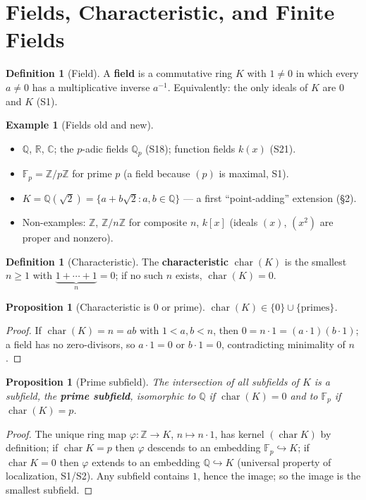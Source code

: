 \documentclass[11pt,a4paper]{article}
\newtheorem{proposition}[theorem]{Proposition}
\theoremstyle{definition}
\newtheorem{definition}[theorem]{Definition}
\newtheorem{example}[theorem]{Example}
\newcommand{\Z}{\mathbb{Z}}
\newcommand{\Q}{\mathbb{Q}}
\newcommand{\R}{\mathbb{R}}
\newcommand{\C}{\mathbb{C}}
\newcommand{\F}{\mathbb{F}}
\newcommand{\ch}{\operatorname{char}}
\begin{document}
\tableofcontents
\newpage

\section{Fields, Characteristic, and Finite Fields}

\begin{definition}[Field]
A \textbf{field} is a commutative ring $K$ with $1\neq0$ in which every $a\neq0$ has a multiplicative
inverse $a^{-1}$. Equivalently: the only ideals of $K$ are $0$ and $K$ (S1).
\end{definition}

\begin{example}[Fields old and new]\label{ex:fields}
\begin{itemize}
  \item $\Q$, $\R$, $\C$; the $p$-adic fields $\Q_p$ (S18); function fields $k(x)$ (S21).
  \item $\F_p=\Z/p\Z$ for prime $p$ (a field because $(p)$ is maximal, S1).
  \item $K=\Q(\sqrt2)=\{a+b\sqrt2:a,b\in\Q\}$ --- a first ``point-adding'' extension (\S2).
  \item Non-examples: $\Z$, $\Z/n\Z$ for composite $n$, $k[x]$ (ideals $(x)$, $(x^2)$ are proper and nonzero).
\end{itemize}
\end{example}

\begin{definition}[Characteristic]
The \textbf{characteristic} $\ch(K)$ is the smallest $n\ge1$ with $\underbrace{1+\cdots+1}_{n}=0$;
if no such $n$ exists, $\ch(K)=0$.
\end{definition}

\begin{proposition}[Characteristic is $0$ or prime]\label{prop:char}
$\ch(K)\in\{0\}\cup\{\text{primes}\}$.
\end{proposition}
\begin{proof}
If $\ch(K)=n=ab$ with $1<a,b<n$, then $0=n\cdot1=(a\cdot1)(b\cdot1)$; a field has no zero-divisors,
so $a\cdot1=0$ or $b\cdot1=0$, contradicting minimality of $n$.
\end{proof}

\begin{proposition}[Prime subfield]\label{prop:prime-subfield}
The intersection of all subfields of $K$ is a subfield, the \textbf{prime subfield}, isomorphic to
$\Q$ if $\ch(K)=0$ and to $\F_p$ if $\ch(K)=p$.
\end{proposition}
\begin{proof}
The unique ring map $\varphi:\Z\to K$, $n\mapsto n\cdot1$, has kernel $(\ch K)$ by definition; if
$\ch K=p$ then $\varphi$ descends to an embedding $\F_p\hookrightarrow K$; if $\ch K=0$ then
$\varphi$ extends to an embedding $\Q\hookrightarrow K$ (universal property of localization, S1/S2).
Any subfield contains $1$, hence the image; so the image is the smallest subfield.
\end{proof}
\end{document}
